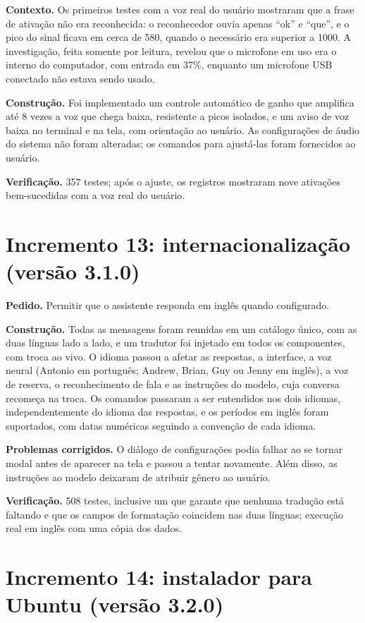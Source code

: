 \textbf{Contexto.} Os primeiros testes com a voz real do usuário mostraram que a frase de ativação não
era reconhecida: o reconhecedor ouvia apenas “ok” e “que”, e o pico do sinal ficava em cerca de 580,
quando o necessário era superior a 1000. A investigação, feita somente por leitura, revelou que o
microfone em uso era o interno do computador, com entrada em 37\%, enquanto um microfone USB conectado
não estava sendo usado.

\textbf{Construção.} Foi implementado um controle automático de ganho que amplifica até 8 vezes a voz
que chega baixa, resistente a picos isolados, e um aviso de voz baixa no terminal e na tela, com
orientação ao usuário. As configurações de áudio do sistema não foram alteradas; os comandos para
ajustá-las foram fornecidos ao usuário.

\textbf{Verificação.} 357 testes; após o ajuste, os registros mostraram nove ativações bem-sucedidas
com a voz real do usuário.

\section{Incremento 13: internacionalização (versão 3.1.0)}

\textbf{Pedido.} Permitir que o assistente responda em inglês quando configurado.

\textbf{Construção.} Todas as mensagens foram reunidas em um catálogo único, com as duas línguas lado a
lado, e um tradutor foi injetado em todos os componentes, com troca ao vivo. O idioma passou a afetar as
respostas, a interface, a voz neural (Antonio em português; Andrew, Brian, Guy ou Jenny em inglês), a
voz de reserva, o reconhecimento de fala e as instruções do modelo, cuja conversa recomeça na troca.
Os comandos passaram a ser entendidos nos dois idiomas, independentemente do idioma das respostas, e os
períodos em inglês foram suportados, com datas numéricas seguindo a convenção de cada idioma.

\textbf{Problemas corrigidos.} O diálogo de configurações podia falhar ao se tornar modal antes de
aparecer na tela e passou a tentar novamente. Além disso, as instruções ao modelo deixaram de atribuir
gênero ao usuário.

\textbf{Verificação.} 508 testes, inclusive um que garante que nenhuma tradução está faltando e que os
campos de formatação coincidem nas duas línguas; execução real em inglês com uma cópia dos dados.

\section{Incremento 14: instalador para Ubuntu (versão 3.2.0)}

